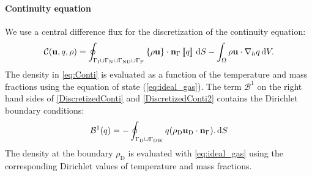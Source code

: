 \paragraph{Continuity equation}
We use a central difference flux for the discretization of the continuity equation: 
\begin{equation}
\mathcal{C}(\textbf{u},q, \rho)  =  \oint_{\Gamma_{\text{I}} \cup\Gamma_{\text{N}}\cup \Gamma_{\text{ND}}\cup \Gamma_{\text{P}}}{\left\{{\rho\textbf{u} }\right\}\cdot \textbf{n}_\Gamma\left[\!\left[{{q}}\right]\!\right] \,\mathrm{d} S} - \int_{\Omega}{\rho \textbf{u}\cdot \nabla_h q} \,\mathrm{d} V.  \label{eq:Conti}
\end{equation}
The density in \cref{eq:Conti} is evaluated as a function of the temperature and mass fractions using the equation of state (\cref{eq:ideal_gas}). The term $\mathcal{B}^1$ on the right hand sides of \cref{DiscretizedConti} and \cref{DiscretizedConti2}  contains the Dirichlet boundary conditions:
\begin{equation}
\mathcal{B}^1(q) =  -\oint_{\Gamma_{\text{D}}\cup \Gamma_{\text{DW}}}{q(\rho_{\text{D}} \textbf{u}_{\text{D}} \cdot \textbf{n}_{\Gamma}). \,\mathrm{d} S}
\end{equation}
The density at the boundary  $\rho_{\text{D}}$ is evaluated with \cref{eq:ideal_gas} using the corresponding Dirichlet values of temperature and mass fractions.
